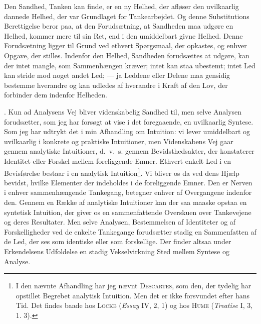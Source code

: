 \documentclass[12pt]{article}
\newcommand{\opage}[1]{\marginnote{\footnotesize\textit{[#1]}}}
\begin{document}
Den Sandhed, Tanken kan finde, er en ny Helhed, der afløser den uvilkaarlig
dannede Helhed, der var Grundlaget for Tankearbejdet. Og denne Substitutions
Berettigelse beror paa, at den Forudsætning, at Sandheden maa udgøre en
Helhed, kommer mere til sin Ret, end i den umiddelbart givne Helhed. Denne
Forudsætning ligger til Grund ved ethvert Spørgsmaal, der opkastes, og enhver
Opgave, der stilles. Indenfor den Helhed, Sandheden forudsættes at udgøre, kan
der intet mangle, som Sammenhængen kræver; intet kan staa ubestemt; intet Led
kan stride mod noget andet Led; --- ja Leddene eller Delene maa gensidig
bestemme hverandre og kan udledes af hverandre i Kraft af den Lov, der
forbinder dem indenfor Helheden.

. Kun ad Analysens Vej bliver videnskabelig Sandhed til, men selve
Analysen forudsætter, som jeg har forsøgt at vise i det foregaaende, en
uvilkaarlig Syntese. Som jeg har udtrykt det i min Afhandling om Intuition: vi
lever umiddelbart
\setcounter{footnote}{0}%
\opage{40}og uvilkaarlig i konkrete og praktiske Intuitioner, men Videnskabens
Vej gaar gennem analytiske Intuitioner, d.~v.~s. gennem Bevidsthedsakter, der
konstaterer Identitet eller Forskel mellem foreliggende Emner. Ethvert enkelt
Led i en Bevisførelse bestaar i en analytisk Intuition\footnote{I den nævnte
Afhandling har jeg nævnt \textsc{Descartes}, som den, der tydelig har opstillet
Begrebet analytisk Intuition. Men det er ikke forsvundet efter hans Tid. Det
findes baade hos \textsc{Locke} (\textit{Essay} IV, 2, 1) og hos \textsc{Hume}
(\textit{Treatise} I, 3, 1. 3).}. Vi bliver os da ved dens Hjælp bevidst,
hvilke Elementer der indeholdes i de foreliggende Emner. Den er Nerven i
enhver sammenhængende Tankegang, betegner enhver af Overgangene indenfor den.
Gennem en Række af analytiske Intuitioner kan der saa maaske opstaa en
syntetisk Intuition, der giver os en sammenfattende Overskuen over Tankevejene
og deres Resultater. Men selve Analysen, Bestemmelsen af Identiteter og af
Forskelligheder ved de enkelte Tankegange forudsætter stadig en Sammenfatten af
de Led, der ses som identiske eller som forskellige. Der finder altsaa under
Erkendelsens Udfoldelse en stadig Vekselvirkning Sted mellem Syntese og
Analyse.
\end{document}
